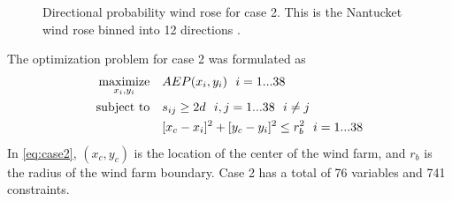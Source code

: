 \documentclass{jpconf}
\begin{document}
\begin{figure}[h!]
\begin{minipage}[t]{18pc}
		\caption{Directional probability wind rose for case 2. This is the Nantucket wind rose binned into 12 directions \cite{wrcc2017}.}
		\label{fig:freqwindrose_12dir}
	\end{minipage}
\end{figure}

The optimization problem for case 2 was formulated as
%
\begin{equation}\label{eq:case2}
	\begin{aligned} [b]
	\underset{x_i,y_i}{\textrm{maximize}} \quad & AEP(x_i,y_i)~~i=1...38\\
	\textrm{subject to} \quad & s_{ij} \geq 2\*d~~i,j=1...38~~i \neq j\\
	 & [x_c-x_i]^2+[y_c-y_i]^2 \leq r_{b}^2~~i=1...38
	\end{aligned}
\end{equation}
%
In \cref{eq:case2}, $(x_c,y_c)$ is the location of the center of the wind farm, and $r_b$ is the radius of the wind farm boundary. Case 2 has a total of 76 variables and 741 constraints.
\end{document}
